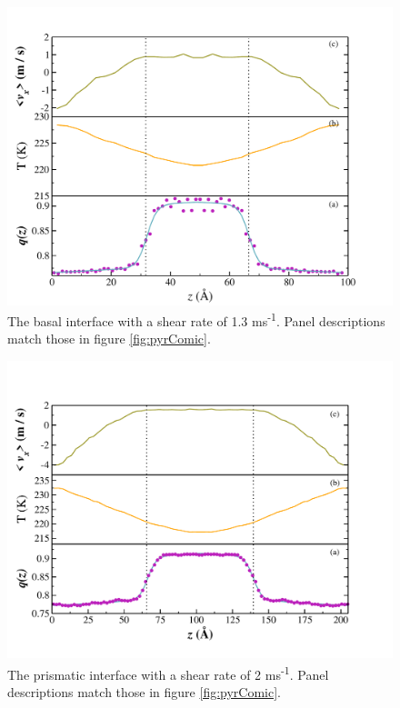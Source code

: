 \documentclass[aps,jcp,preprint,showpacs,superscriptaddress,groupedaddress]{revtex4}  %
\begin{document}
\newpage
\begin{figure}
\includegraphics[width=\linewidth]{B_comic_strip}
\caption{\label{fig:bComic} The basal interface with a shear
rate of 1.3 ms\textsuperscript{-1}. Panel descriptions match those in figure \ref{fig:pyrComic}.}
\end{figure}

\newpage
\begin{figure}
\includegraphics[width=\linewidth]{prismatic_comic_strip}
\caption{\label{fig:pComic} The prismatic interface with a shear
rate of 2 ms\textsuperscript{-1}. Panel descriptions match those in figure \ref{fig:pyrComic}.}
\end{figure}
\end{document}
